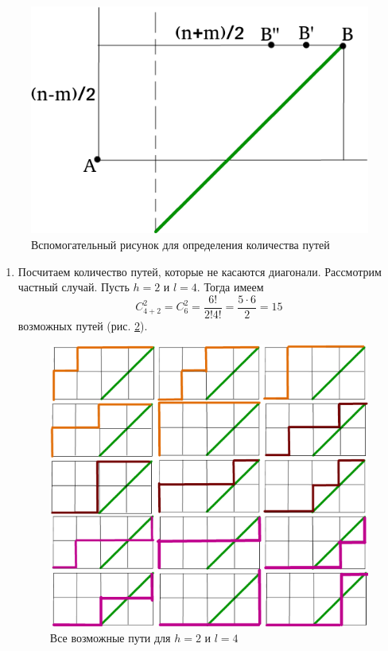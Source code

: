 \begin{enumerate}[label=\alph*)]
\begin{figure}[h!]
  \centering
  \includegraphics[width=.6\textwidth]{./pictures/4_22_9.png}
  \caption{Вспомогательный рисунок для определения количества путей}
  \label{fig:4229}
\end{figure}

\begin{enumerate}[label=(\roman*)]
\item Посчитаем количество путей, которые не касаются диагонали.
Рассмотрим частный случай.
Пусть $h = 2$ и $l = 4$.
Тогда имеем
$$C_{4+2}^2 =
C_6^2 =
\frac{6!}{2! 4!} =
\frac{5 \cdot 6}{2} =
15$$
возможных путей (рис. \ref{fig:42210}).

\begin{figure}[h!]
  \centering
  \includegraphics[width=.8\textwidth]{./pictures/4_22_10.png}
  \caption{Все возможные пути для $h = 2$ и $l = 4$}
  \label{fig:42210}
\end{figure}


\end{enumerate}
\end{enumerate}
